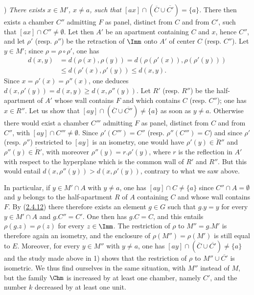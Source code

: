 \documentclass[12pt,a4paper,oneside,english]{smfart}
\newcommand{\btref}[1]{\hyperlink{bt:#1}{#1}}
\theoremstyle{definition}
\theoremstyle{bt}
\begin{document}
\smallskip{}) \emph{There exists $x\in M'$, $x\neq a$, such that
$[ax]\cap(\overline{C}\cup\overline{C'})=\{a\}$.} There then exists a chamber
$C''$ admitting $F$ as panel, distinct from $C$ and from $C'$, such that
$[ax]\cap C''\neq\emptyset$. Let then $A'$ be an apartment containing $C$ and
$x$, hence $C''$, and let $\rho'$ (resp. $\rho''$) be the retraction of $\Imm$
onto $A'$ of center $C$ (resp. $C''$). Let $y\in M'$; since
$\rho=\rho\circ\rho'$, one has
\begin{align*}
d(x,y)&=d(\rho(x),\rho(y))=d(\rho(\rho'(x)),\rho(\rho'(y)))\\
&\le d(\rho'(x),\rho'(y))\le d(x,y).
\end{align*}
Since $x=\rho'(x)=\rho''(x)$, one deduces
$d(x,\rho'(y))=d(x,y)\ge d(x,\rho''(y))$. Let $R'$ (resp. $R''$) be the
half-apartment of $A'$ whose wall contains $F$ and which contains $C$ (resp.
$C''$); one has $x\in R''$. Let us show that
$[ay]\cap(\overline{C}\cup\overline{C''})\neq\{a\}$ as soon as $y\neq a$.
Otherwise there would exist a chamber $C'''$ admitting $F$ as panel, distinct
from $C$ and from $C''$, with $[ay]\cap C'''\neq\emptyset$. Since
$\rho'(C''')=C''$ (resp. $\rho''(C''')=C$) and since $\rho'$ (resp. $\rho''$)
restricted to $[ay]$ is an isometry, one would have
$\rho'(y)\in\mathring{R}''$ and $\rho''(y)\in\mathring{R}'$, with moreover
$\rho''(y)=r.\rho'(y)$, where $r$ is the reflection in $A'$ with respect to
the hyperplane which is the common wall of $R'$ and $R''$. But this would
entail $d(x,\rho''(y))>d(x,\rho'(y))$, contrary to what we saw above.

In particular, if $y\in M'\cap A$ with $y\neq a$, one has
$[ay]\cap C\neq\{a\}$ since $C''\cap A=\emptyset$ and $y$ belongs to the
half-apartment $R$ of $A$ containing $C$ and whose wall contains $F$. By
(\btref{2.4.12}) there therefore exists an element $g\in G$ such that $g.y=y$ for
every $y\in M'\cap A$ and $g.C''=C'$. One then has $g.C=C$, and this entails
$\rho(g.z)=\rho(z)$ for every $z\in\Imm$. The restriction of $\rho$ to
$M''=g.M'$ is therefore again an isometry, and the enclosure of
$\rho(M'')=\rho(M')$ is still equal to $E$. Moreover, for every $y\in M''$
with $y\neq a$, one has $[ay]\cap(\overline{C}\cup\overline{C'})\neq\{a\}$ and
the study made above in 1) shows that the restriction of $\rho$ to
$M''\cup\overline{C'}$ is isometric. We thus find ourselves in the same
situation, with $M''$ instead of $M$, but the family $\Chm$ is increased by at
least one chamber, namely $C'$, and the number $k$ decreased by at least one
unit.
\end{document}
